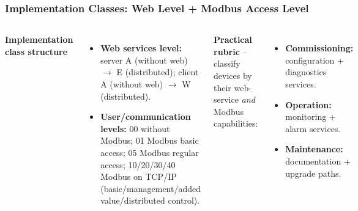 \begin{frame}
	\frametitle{Implementation Classes: Web Level + Modbus Access Level}
	\small
	\begin{columns}[T,onlytextwidth]
		\textbf{Implementation class structure}
		\begin{itemize}
			\item \textbf{Web services level:} server A (without web) $\rightarrow$ E (distributed); client A (without web) $\rightarrow$ W (distributed).
			\item \textbf{User/communication levels:} 00 without Modbus; 01 Modbus basic access; 05 Modbus regular access; 10/20/30/40 Modbus on TCP/IP (basic/management/added value/distributed control).
		\end{itemize}
		\textbf{Practical rubric} -- classify devices by their web-service \emph{and} Modbus capabilities:
		\begin{itemize}
			\item \textbf{Commissioning:} configuration + diagnostics services.
			\item \textbf{Operation:} monitoring + alarm services.
			\item \textbf{Maintenance:} documentation + upgrade paths.
		\end{itemize}
	\end{columns}
\end{frame}


